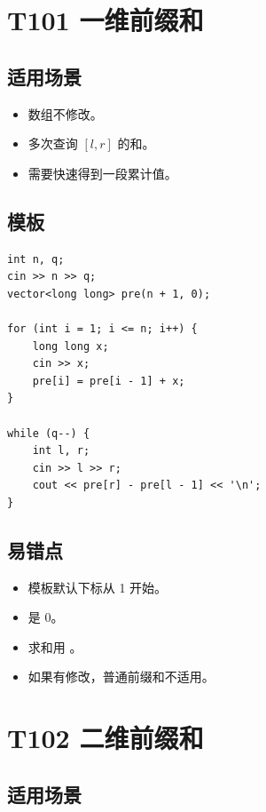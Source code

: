 \section{T101 一维前缀和}\label{sec:09-3}\label{tpl:101}

\subsection{适用场景}

\begin{itemize}
  \item 数组不修改。
  \item 多次查询 $[l,r]$ 的和。
  \item 需要快速得到一段累计值。
\end{itemize}

\subsection{模板}

\begin{lstlisting}
int n, q;
cin >> n >> q;
vector<long long> pre(n + 1, 0);

for (int i = 1; i <= n; i++) {
    long long x;
    cin >> x;
    pre[i] = pre[i - 1] + x;
}

while (q--) {
    int l, r;
    cin >> l >> r;
    cout << pre[r] - pre[l - 1] << '\n';
}
\end{lstlisting}

\subsection{易错点}

\begin{itemize}
  \item 模板默认下标从 1 开始。
  \item {} 是 0。
  \item 求和用 。
  \item 如果有修改，普通前缀和不适用。
\end{itemize}

\section{T102 二维前缀和}\label{sec:09-4}\label{tpl:102}

\subsection{适用场景}

